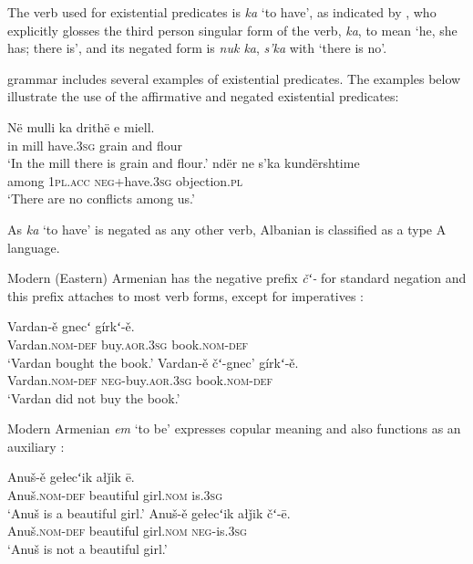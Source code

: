 \documentclass[output=paper,colorlinks,citecolor=brown]{langscibook}
\begin{document}
\begin{paperappendix}
\begin{unindented}
The verb used for existential predicates is \textit{ka} `to have', as
indicated by \citet[12]{Camaj1984}, who explicitly glosses the third person
singular form of the verb, \textit{ka}, to mean `he, she has; there is',
and its negated form is \textit{nuk ka}, \textit{s’ka} with `there is no'. 

 grammar includes several examples of existential predicates. The examples below illustrate the use of the affirmative and negated existential predicates:
%
\begin{exe}\ex \gll Në mulli ka drithë e miell. \\
in mill have.\textsc{3sg} grain and flour \\
    \glt `In the mill there is grain and flour.' \parencite[12/257]{Camaj1984}
\ex \gll ndër ne s’ka kundërshtime \\
among \textsc{1pl}.\textsc{acc} \textsc{neg}+have.\textsc{3sg} objection.\textsc{pl} \\
    \glt `There are no conflicts among us.' \citep[70]{Camaj1984}
    \end{exe} 

As \textit{ka} `to have' is negated as any other verb, Albanian is classified as a type A language. 


Modern (Eastern) Armenian has the negative prefix \textit{čʻ-} for standard
negation and this prefix attaches to most verb forms, except for
imperatives \parencite[522]{DumTragut2009}:
%
\begin{exe}\ex \gll Vardan-ě gnecʻ gírkʻ-ě.  \\
Vardan.\textsc{nom}-\textsc{def} buy.\textsc{aor}.\textsc{3sg} book.\textsc{nom-def} \\
    \glt `Vardan bought the book.' \parencite[51]{DumTragut2009}
\ex \gll Vardan-ě čʻ-gnec’ gírkʻ-ě.  \\
Vardan.\textsc{nom}-\textsc{def} \textsc{neg}-buy.\textsc{aor}.\textsc{3sg} book.\textsc{nom-def} \\
    \glt `Vardan did not buy the book.' \parencite[51]{DumTragut2009}
    \end{exe} 

Modern Armenian \textit{em} `to be' expresses copular meaning and also
functions as an auxiliary \parencite[215]{DumTragut2009}:

\begin{exe}\ex \gll Anuš-ě gełecʻik   ałǰik ē. \\
Anuš.\textsc{nom}-\textsc{def} beautiful girl.\textsc{nom} is.\textsc{3sg} \\
    \glt `Anuš is a beautiful girl.' \parencite[215]{DumTragut2009}
\ex \gll Anuš-ě gełecʻik ałǰik čʻ-ē.  \\
Anuš.\textsc{nom}-\textsc{def} beautiful girl.\textsc{nom} \textsc{neg}-is.\textsc{3sg} \\
    \glt `Anuš is not a beautiful girl.' \parencite[215]{DumTragut2009}
    \end{exe}


\end{unindented}
\end{paperappendix}
\end{document}
